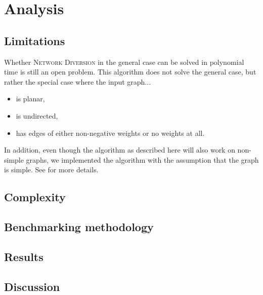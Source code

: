 \section{Analysis}

\subsection{Limitations}
Whether \textsc{Network Diversion} in the general case can be solved in polynomial time is still an open problem.
This algorithm does not solve the general case, but rather the special case where the input graph...
\begin{itemize}
    \item is planar,
    \item is undirected,
    \item has edges of either non-negative weights or no weights at all.
\end{itemize}

In addition, even though the algorithm as described here will also work on non-simple graphs, we implemented the algorithm with the assumption that the graph is simple. See  for more details. 

\subsection{Complexity}

\subsection{Benchmarking methodology}

\subsection{Results}

\subsection{Discussion}
